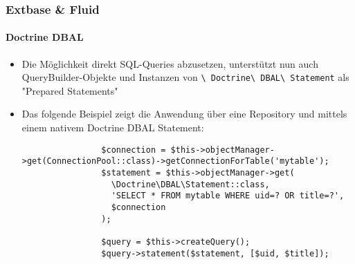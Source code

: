 \begin{frame}[fragile]
	\frametitle{Extbase \& Fluid}
	\framesubtitle{Doctrine DBAL}

	\lstset{basicstyle=\tiny\ttfamily}

	\begin{itemize}
		\item Die Möglichkeit direkt SQL-Queries abzusetzen, unterstützt nun auch QueryBuilder-Objekte und Instanzen von 
			\texttt{\textbackslash
			Doctrine\textbackslash
			DBAL\textbackslash
			Statement} als "Prepared Statements"
		\item Das folgende Beispiel zeigt die Anwendung über eine Repository und mittels einem nativem Doctrine DBAL Statement:

			\begin{lstlisting}
				$connection = $this->objectManager->get(ConnectionPool::class)->getConnectionForTable('mytable');
				$statement = $this->objectManager->get(
				  \Doctrine\DBAL\Statement::class,
				  'SELECT * FROM mytable WHERE uid=? OR title=?',
				  $connection
				);

				$query = $this->createQuery();
				$query->statement($statement, [$uid, $title]);
			\end{lstlisting}
	\end{itemize}

\end{frame}

